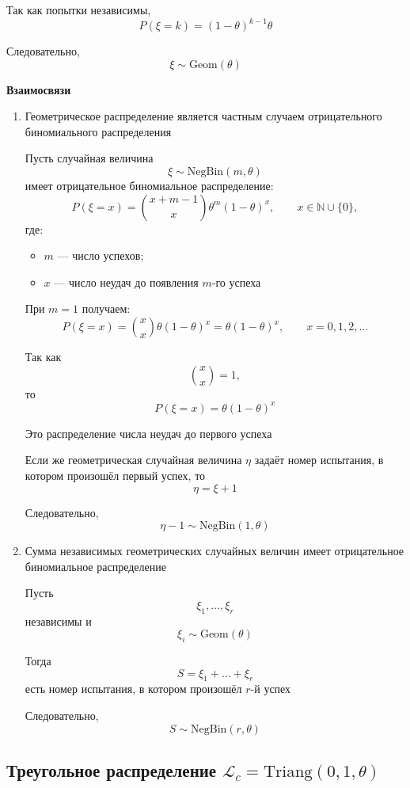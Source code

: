 \documentclass[12pt,a4paper]{article}
\theoremstyle{definition}
\begin{document}
Так как попытки независимы,
\[
P(\xi=k)
=
(1-\theta)^{k-1}\theta
\]

Следовательно,
\[
\xi \sim \mathrm{Geom}(\theta)
\]

\textbf{Взаимосвязи}
\begin{enumerate}
    \item Геометрическое распределение является частным случаем отрицательного биномиального распределения

Пусть случайная величина
\[
\xi \sim \mathrm{NegBin}(m,\theta)
\]
имеет отрицательное биномиальное распределение:
\[
P(\xi=x)=
\binom{x+m-1}{x}\theta^m(1-\theta)^x,
\qquad x\in\mathbb N\cup\{0\},
\]
где:
\begin{itemize}
    \item $m$ --- число успехов;
    \item $x$ --- число неудач до появления $m$-го успеха
\end{itemize}

При $m=1$ получаем:
\[
P(\xi=x)=
\binom{x}{x}\theta(1-\theta)^x
=
\theta(1-\theta)^x,
\qquad x=0,1,2,\dots
\]

Так как
\[
\binom{x}{x}=1,
\]
то
\[
P(\xi=x)=\theta(1-\theta)^x
\]

Это распределение числа неудач до первого успеха

Если же геометрическая случайная величина $\eta$ задаёт номер испытания, в котором произошёл первый успех, то
\[
\eta = \xi+1
\]

Следовательно,
\[
\eta-1 \sim \mathrm{NegBin}(1,\theta)
\]

    \item Сумма независимых геометрических случайных величин имеет отрицательное биномиальное распределение

    Пусть
    \[
    \xi_1,\dots,\xi_r
    \]
    независимы и
    \[
    \xi_i \sim \mathrm{Geom}(\theta)
    \]

    Тогда
    \[
    S=\xi_1+\dots+\xi_r
    \]
    есть номер испытания, в котором произошёл $r$-й успех

    Следовательно,
    \[
    S \sim \mathrm{NegBin}(r,\theta)
    \]
\end{enumerate}

\subsection{\texorpdfstring
{Треугольное распределение $\mathscr{L}_c=\mathrm{Triang}(0,1,\theta)$}
{Треугольное распределение Lc = Triang(0,1,theta)}}
\end{document}
